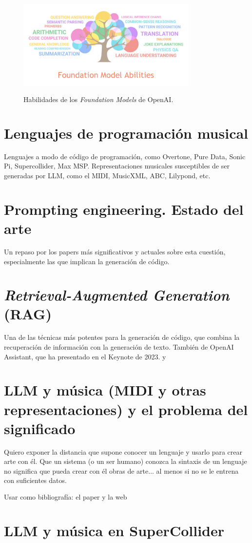     \begin{figure}[h]
        \caption{Habilidades de los \textit{Foundation Models} de OpenAI.}
        \centering
        \includegraphics[width=0.8\textwidth]{./figuras/fundation_models_habilities.png}
        \label{fig:fundation_models_habilities}
    \end{figure}

\section{Lenguajes de programación musical}
    Lenguajes a modo de código de programación, como Overtone, Pure Data, Sonic Pi, Supercollider, Max MSP. Representaciones musicales susceptibles de ser generadas por LLM, como el MIDI, MusicXML, ABC, Lilypond, etc.

\section{Prompting engineering. Estado del arte}
    Un repaso por los papers más significativos y actuales sobre esta cuestión, especialmente las que implican la generación de código.

\section{\textit{Retrieval-Augmented Generation} (RAG)}
    Una de las técnicas más potentes para la generación de código, que combina la recuperación de información con la generación de texto. También de OpenAI Assistant, que ha presentado en el Keynote de 2023. \cite{WhatRetrievalaugmentedGeneration2021} y \cite{lewisRetrievalAugmentedGenerationKnowledgeIntensive2021}

\section{LLM y música (MIDI y otras representaciones) y el problema del significado}
    Quiero exponer la distancia que supone conocer un lenguaje y usarlo para crear arte con él. Que un sistema (o un ser humano) conozca la sintaxis de un lenguaje no significa que pueda crear con él obras de arte... al menos si no se le entrena con suficientes datos.
    
    Usar como bibliografía: el paper \cite{lewisRetrievalAugmentedGenerationKnowledgeIntensive2021} y la web \cite{WhatRetrievalaugmentedGeneration2021}

\section{LLM y música en SuperCollider}